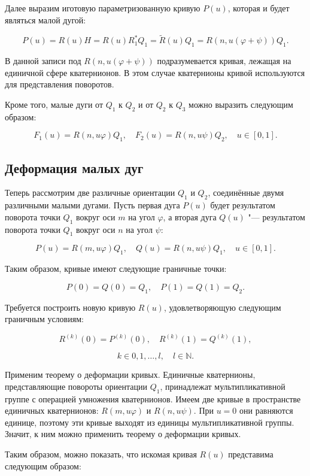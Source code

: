 Далее выразим иготовую параметризованную кривую $P(u)$, которая и будет являться малой дугой:

\begin{equation}
P(u)=R(u)H=R(u)R_1^*Q_1=\tilde R(u)Q_1=R(n,u(\varphi+\psi))Q_1.
\label{orientation-arc}
\end{equation}

В данной записи под $R(n,u(\varphi+\psi))$ подразумевается кривая, лежащая на единичной сфере кватернионов. В этом
случае кватернионы кривой используются для представления поворотов.

Кроме того, малые дуги от $Q_1$ к $Q_2$ и от $Q_2$ к $Q_3$ можно выразить следующим образом:

$$
F_1(u)=R(n,u\varphi)Q_1, \quad F_2(u)=R(n,u\psi)Q_2, \quad u \in [0,1].
$$

\subsection*{Деформация малых дуг}

Теперь рассмотрим две различные ориентации $Q_1$ и $Q_2$, соединённые двумя различными малыми дугами. Пусть первая дуга
$P(u)$ будет результатом поворота точки $Q_1$ вокруг оси $m$ на угол $\varphi$, а вторая дуга $Q(u)$ "--- результатом
поворота точки $Q_1$ вокруг оси $n$ на угол $\psi$:

$$
P(u)=R(m,u\varphi)Q_1, \quad Q(u)=R(n,u\psi)Q_1, \quad u \in [0,1].
$$

Таким образом, кривые имеют следующие граничные точки:

$$
P(0)=Q(0)=Q_1, \quad P(1)=Q(1)=Q_2.
$$

Требуется построить новую кривую $R(u)$, удовлетворяющую следующим граничным условиям:

$$
R^{(k)}(0)=P^{(k)}(0), \quad R^{(k)}(1)=Q^{(k)}(1),
$$

$$
k \in {0,1,\dots,l}, \quad l \in \mathbb{N}.
$$

Применим теорему о деформации кривых. Единичные кватернионы, представляющие повороты ориентации $Q_1$, принадлежат
мультипликативной группе с операцией умножения кватернионов. Имеем две кривые в пространстве единичных кватернионов:
$R(m,u\varphi)$ и $R(n,u\psi)$. При $u=0$ они равняются единице, поэтому эти кривые выходят из единицы мультипликативной
группы. Значит, к ним можно применить теорему о деформации кривых.

Таким образом, можно показать, что искомая кривая $R(u)$ представима следующим образом:

